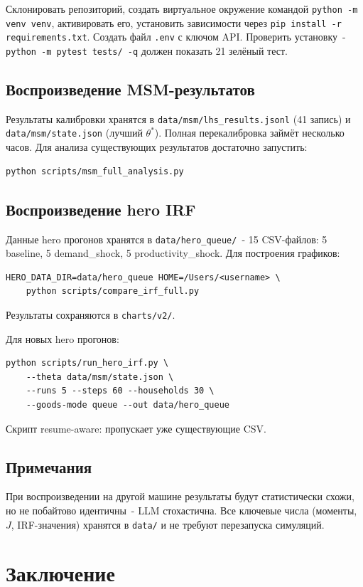 \documentclass[12pt, a4paper]{article}
\begin{document}
Склонировать репозиторий, создать виртуальное окружение командой \texttt{python -m venv venv}, активировать его, установить зависимости через \texttt{pip install -r requirements.txt}. Создать файл \texttt{.env} с ключом API. Проверить установку~- \texttt{python -m pytest tests/ -q} должен показать 21 зелёный тест.

\subsection{Воспроизведение MSM-результатов}

Результаты калибровки хранятся в \texttt{data/msm/lhs\_results.jsonl} (41 запись) и \texttt{data/msm/state.json} (лучший $\theta^*$). Полная перекалибровка займёт несколько часов. Для анализа существующих результатов достаточно запустить:
\begin{verbatim}
python scripts/msm_full_analysis.py
\end{verbatim}

\subsection{Воспроизведение hero IRF}

Данные hero прогонов хранятся в \texttt{data/hero\_queue/}~- 15 CSV-файлов: 5 baseline, 5 demand\_shock, 5 productivity\_shock. Для построения графиков:
\begin{verbatim}
HERO_DATA_DIR=data/hero_queue HOME=/Users/<username> \
    python scripts/compare_irf_full.py
\end{verbatim}
Результаты сохраняются в \texttt{charts/v2/}.

Для новых hero прогонов:
\begin{verbatim}
python scripts/run_hero_irf.py \
    --theta data/msm/state.json \
    --runs 5 --steps 60 --households 30 \
    --goods-mode queue --out data/hero_queue
\end{verbatim}
Скрипт resume-aware: пропускает уже существующие CSV.


\subsection{Примечания}

При воспроизведении на другой машине результаты будут статистически схожи, но не побайтово идентичны~- LLM стохастична. Все ключевые числа (моменты, $J$, IRF-значения) хранятся в \texttt{data/} и не требуют перезапуска симуляций.

\section{Заключение}
\end{document}
